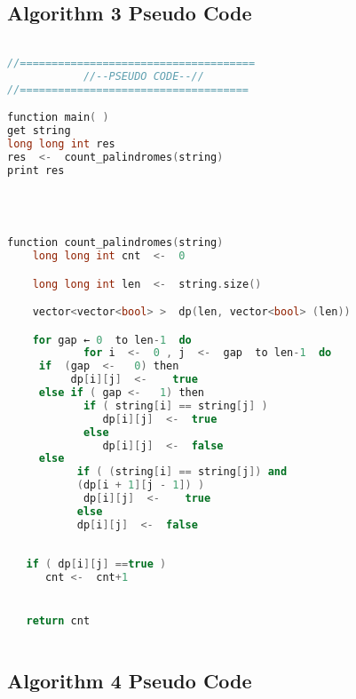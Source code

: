 \documentclass[conference]{IEEEtran}
\begin{document}
\bigskip\subsection{Algorithm 3 Pseudo Code}\label{AA}



\begin{lstlisting}[caption=Algorithm 3, style=chstyle, language=c++]

//=====================================
            //--PSEUDO CODE--//
//====================================

function main( )
get string
long long int res
res  <-  count_palindromes(string)
print res




function count_palindromes(string)
	long long int cnt  <-  0

	long long int len  <-  string.size()

	vector<vector<bool> >  dp(len, vector<bool> (len))

	for gap ← 0  to len-1  do
            for i  <-  0 , j  <-  gap  to len-1  do 
     if  (gap  <-   0) then
          dp[i][j]  <-    true
     else if ( gap <-   1) then
            if ( string[i] == string[j] )
	           dp[i][j]  <-  true
            else
	           dp[i][j]  <-  false     
     else
           if ( (string[i] == string[j]) and
           (dp[i + 1][j - 1]) )
            dp[i][j]  <-    true
           else
	       dp[i][j]  <-  false
     
     
   if ( dp[i][j] ==true )
      cnt <-  cnt+1


   return cnt



\end{lstlisting}

\bigskip\subsection{Algorithm 4 Pseudo Code}\label{AA}
\end{document}

